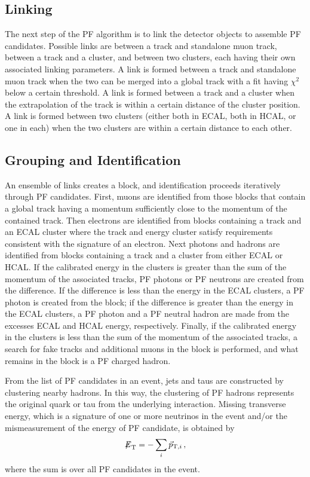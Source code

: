 \subsection{Linking\label{subsec:linking}}

The next step of the PF algorithm is to link the detector objects to assemble PF candidates.
Possible links are between a track and standalone muon track, between a track and a cluster, and
between two clusters, each having their own associated linking parameters. A link is formed between
a track and standalone muon track when the two can be merged into a global track with a fit
having $\chi^2$ below a certain threshold. A link is formed between a track and a cluster when
the extrapolation of the track is within a certain distance of the cluster position.
A link is formed between two clusters
(either both in ECAL, both in HCAL, or one in each) when the two clusters are within a certain distance
to each other.

\subsection{Grouping and Identification\label{subsec:groupid}}

An ensemble of links creates a block, and identification proceeds iteratively through PF candidates.
First, muons are identified from those blocks that contain a global track having a momentum
sufficiently close to the momentum of the contained track. Then electrons are identified from blocks
containing a track and an ECAL cluster where the track and energy cluster satisfy requirements
consistent with the signature of an electron. Next photons and hadrons are identified from blocks
containing a track and a cluster from either ECAL or HCAL. If the calibrated energy in the clusters is
greater than the sum of the momentum of the associated tracks, PF photons or PF neutrons are created
from the difference. If the difference is less than the energy in the ECAL clusters, a PF photon is
created from the block; if the difference is greater than the energy in the ECAL clusters,
a PF photon and a PF neutral hadron are made from the excesses ECAL and HCAL energy, respectively.
Finally, if the calibrated energy in the clusters is less than the sum of the momentum of the associated
tracks, a search for fake tracks and additional muons in the block is performed, and what remains
in the block is a PF charged hadron.

From the list of PF candidates in an event, jets and taus are constructed by clustering nearby
hadrons. In this way, the clustering of PF hadrons represents the original quark or tau from the
underlying interaction. Missing transverse energy, which is a signature of one or more neutrinos
in the event and/or the mismeasurement of the energy of PF candidate, is obtained by
\begin{equation}
{\not\mathrel{E}}_{\text{T}} = - \sum_i \vec{p}_{{\rm T},i} \, ,
\end{equation}
where the sum is over all PF candidates in the event.

